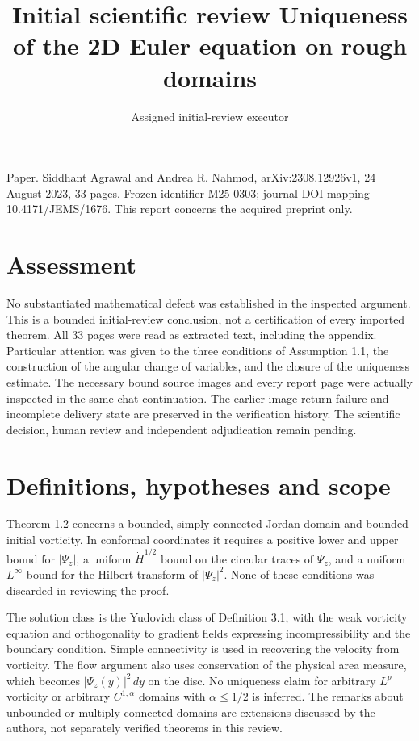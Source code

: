 \documentclass[10pt]{article}
\title{Initial scientific review
Uniqueness of the 2D Euler equation on rough domains}
\author{Assigned initial-review executor}
\date{}
\begin{document}
\maketitle
Paper. Siddhant Agrawal and Andrea R. Nahmod, arXiv:2308.12926v1, 24 August 2023, 33 pages. Frozen identifier M25-0303; journal DOI mapping 10.4171/JEMS/1676. This report concerns the acquired preprint only.\par
\section*{Assessment}
No substantiated mathematical defect was established in the inspected argument. This is a bounded initial-review conclusion, not a certification of every imported theorem. All 33 pages were read as extracted text, including the appendix. Particular attention was given to the three conditions of Assumption 1.1, the construction of the angular change of variables, and the closure of the uniqueness estimate. The necessary bound source images and every report page were actually inspected in the same-chat continuation. The earlier image-return failure and incomplete delivery state are preserved in the verification history. The scientific decision, human review and independent adjudication remain pending.\par
\section*{Definitions, hypotheses and scope}
Theorem 1.2 concerns a bounded, simply connected Jordan domain and bounded initial vorticity. In conformal coordinates it requires a positive lower and upper bound for \(|\Psi_z|\), a uniform \(\dot H^{1/2}\) bound on the circular traces of \(\Psi_z\), and a uniform \(L^\infty\) bound for the Hilbert transform of \(|\Psi_z|^2\). None of these conditions was discarded in reviewing the proof.\par
The solution class is the Yudovich class of Definition 3.1, with the weak vorticity equation and orthogonality to gradient fields expressing incompressibility and the boundary condition. Simple connectivity is used in recovering the velocity from vorticity. The flow argument also uses conservation of the physical area measure, which becomes \(|\Psi_z(y)|^2\,dy\) on the disc. No uniqueness claim for arbitrary \(L^p\) vorticity or arbitrary \(C^{1,\alpha}\) domains with \(\alpha\leq1/2\) is inferred. The remarks about unbounded or multiply connected domains are extensions discussed by the authors, not separately verified theorems in this review.\par
\end{document}
